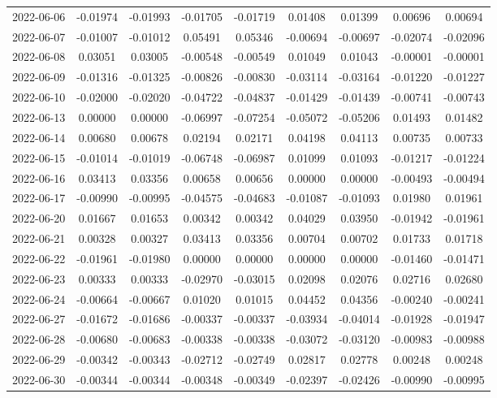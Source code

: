 \begin{footnotesize}
\begin{longtable}{lcccccccc}
2022-06-06 & -0.01974 & -0.01993 & -0.01705 & -0.01719 & 0.01408 & 0.01399 & 0.00696 & 0.00694 \\
2022-06-07 & -0.01007 & -0.01012 & 0.05491 & 0.05346 & -0.00694 & -0.00697 & -0.02074 & -0.02096 \\
2022-06-08 & 0.03051 & 0.03005 & -0.00548 & -0.00549 & 0.01049 & 0.01043 & -0.00001 & -0.00001 \\
2022-06-09 & -0.01316 & -0.01325 & -0.00826 & -0.00830 & -0.03114 & -0.03164 & -0.01220 & -0.01227 \\
2022-06-10 & -0.02000 & -0.02020 & -0.04722 & -0.04837 & -0.01429 & -0.01439 & -0.00741 & -0.00743 \\
2022-06-13 & 0.00000 & 0.00000 & -0.06997 & -0.07254 & -0.05072 & -0.05206 & 0.01493 & 0.01482 \\
2022-06-14 & 0.00680 & 0.00678 & 0.02194 & 0.02171 & 0.04198 & 0.04113 & 0.00735 & 0.00733 \\
2022-06-15 & -0.01014 & -0.01019 & -0.06748 & -0.06987 & 0.01099 & 0.01093 & -0.01217 & -0.01224 \\
2022-06-16 & 0.03413 & 0.03356 & 0.00658 & 0.00656 & 0.00000 & 0.00000 & -0.00493 & -0.00494 \\
2022-06-17 & -0.00990 & -0.00995 & -0.04575 & -0.04683 & -0.01087 & -0.01093 & 0.01980 & 0.01961 \\
2022-06-20 & 0.01667 & 0.01653 & 0.00342 & 0.00342 & 0.04029 & 0.03950 & -0.01942 & -0.01961 \\
2022-06-21 & 0.00328 & 0.00327 & 0.03413 & 0.03356 & 0.00704 & 0.00702 & 0.01733 & 0.01718 \\
2022-06-22 & -0.01961 & -0.01980 & 0.00000 & 0.00000 & 0.00000 & 0.00000 & -0.01460 & -0.01471 \\
2022-06-23 & 0.00333 & 0.00333 & -0.02970 & -0.03015 & 0.02098 & 0.02076 & 0.02716 & 0.02680 \\
2022-06-24 & -0.00664 & -0.00667 & 0.01020 & 0.01015 & 0.04452 & 0.04356 & -0.00240 & -0.00241 \\
2022-06-27 & -0.01672 & -0.01686 & -0.00337 & -0.00337 & -0.03934 & -0.04014 & -0.01928 & -0.01947 \\
2022-06-28 & -0.00680 & -0.00683 & -0.00338 & -0.00338 & -0.03072 & -0.03120 & -0.00983 & -0.00988 \\
2022-06-29 & -0.00342 & -0.00343 & -0.02712 & -0.02749 & 0.02817 & 0.02778 & 0.00248 & 0.00248 \\
2022-06-30 & -0.00344 & -0.00344 & -0.00348 & -0.00349 & -0.02397 & -0.02426 & -0.00990 & -0.00995 \\

\end{longtable}
\end{footnotesize}
